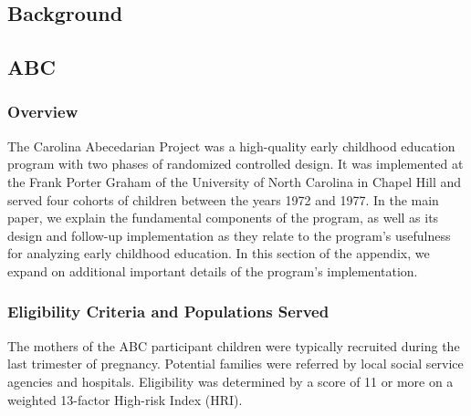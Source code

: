 \begin{appendices}
\setcounter{figure}{0}  \renewcommand{\thefigure}{A.\arabic{figure}}
\setcounter{table}{0}   \renewcommand{\thetable}{A.\arabic{table}}

\section{Background}

\subsection{ABC}

\subsubsection{Overview}

\noindent The Carolina Abecedarian Project was a high-quality early childhood education program with two phases of randomized controlled design. It was implemented at the Frank Porter Graham of the University of North Carolina in Chapel Hill and served four cohorts of children between the years 1972 and 1977. In the main paper, we explain the fundamental components of the program, as well as its design and follow-up implementation as they relate to the program's usefulness for analyzing early childhood education. In this section of the appendix, we expand on additional important details of the program's implementation.

\subsubsection{Eligibility Criteria and Populations Served}

\noindent The mothers of the ABC participant children were typically recruited during the last trimester  of pregnancy. Potential families were referred by local social service agencies and hospitals. Eligibility was determined by a score of 11 or more on a weighted 13-factor High-risk Index (HRI).\\ 


\end{appendices}
